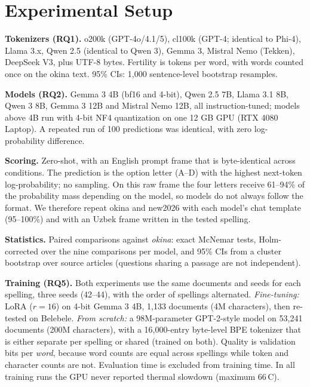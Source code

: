 \section{Experimental Setup}
\textbf{Tokenizers (RQ1).} o200k (GPT-4o/4.1/5), cl100k (GPT-4; identical to Phi-4), Llama 3.x, Qwen 2.5 (identical to Qwen 3), Gemma 3, Mistral Nemo (Tekken), DeepSeek V3, plus UTF-8 bytes. Fertility is tokens per word, with words counted once on the okina text. 95\% CIs: 1{,}000 sentence-level bootstrap resamples.

\textbf{Models (RQ2).} Gemma 3 4B (bf16 and 4-bit), Qwen 2.5 7B, Llama 3.1 8B, Qwen 3 8B, Gemma 3 12B and Mistral Nemo 12B, all instruction-tuned; models above 4B run with 4-bit NF4 quantization \citep{dettmers2023qlora} on one 12 GB GPU (RTX 4080 Laptop). A repeated run of 100 predictions was identical, with zero log-probability difference.

\textbf{Scoring.} Zero-shot, with an English prompt frame that is byte-identical across conditions. The prediction is the option letter (A--D) with the highest next-token log-probability; no sampling. On this raw frame the four letters receive 61--94\% of the probability mass depending on the model, so models do not always follow the format. We therefore repeat okina and new2026 with each model's chat template (95--100\%) and with an Uzbek frame written in the tested spelling.

\textbf{Statistics.} Paired comparisons against \emph{okina}: exact McNemar tests, Holm-corrected over the nine comparisons per model, and 95\% CIs from a cluster bootstrap over source articles (questions sharing a passage are not independent).

\textbf{Training (RQ5).} Both experiments use the same documents and seeds for each spelling, three seeds (42--44), with the order of spellings alternated. \emph{Fine-tuning:} LoRA ($r=16$) on 4-bit Gemma 3 4B, 1{,}133 documents (4M characters), then re-tested on Belebele. \emph{From scratch:} a 98M-parameter GPT-2-style model on 53{,}241 documents (200M characters), with a 16{,}000-entry byte-level BPE tokenizer that is either separate per spelling or shared (trained on both). Quality is validation bits per \emph{word}, because word counts are equal across spellings while token and character counts are not. Evaluation time is excluded from training time. In all training runs the GPU never reported thermal slowdown (maximum 66\,\textdegree{}C).

